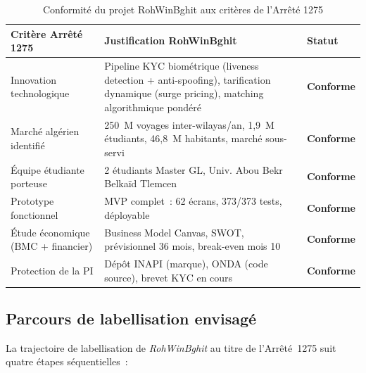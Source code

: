 \documentclass[12pt, a4paper, oneside]{report}
\begin{document}
\begin{table}[H]
\centering
\footnotesize
\renewcommand{\arraystretch}{1.3}
\begin{tabularx}{\textwidth}{|p{4cm}|X|p{2.5cm}|}
\hline
\rowcolor{rohlight}
\textbf{Critère Arrêté 1275} & \textbf{Justification RohWinBghit} & \textbf{Statut} \\
\hline
Innovation technologique & Pipeline KYC biométrique (liveness detection + anti-spoofing), tarification dynamique (surge pricing), matching algorithmique pondéré & \textcolor{green!60!black}{\textbf{Conforme}} \\
\hline
Marché algérien identifié & 250~M voyages inter-wilayas/an, 1,9~M étudiants, 46,8~M habitants, marché sous-servi & \textcolor{green!60!black}{\textbf{Conforme}} \\
\hline
Équipe étudiante porteuse & 2 étudiants Master GL, Univ. Abou Bekr Belkaïd Tlemcen & \textcolor{green!60!black}{\textbf{Conforme}} \\
\hline
Prototype fonctionnel & MVP complet~: 62 écrans, 373/373 tests, déployable & \textcolor{green!60!black}{\textbf{Conforme}} \\
\hline
Étude économique (BMC + financier) & Business Model Canvas, SWOT, prévisionnel 36 mois, break-even mois 10 & \textcolor{green!60!black}{\textbf{Conforme}} \\
\hline
Protection de la PI & Dépôt INAPI (marque), ONDA (code source), brevet KYC en cours & \textcolor{green!60!black}{\textbf{Conforme}} \\
\hline
\end{tabularx}
  \caption{Conformité du projet RohWinBghit aux critères de l'Arrêté 1275}
  \label{tab:arrete1275}
\end{table}

\subsection{Parcours de labellisation envisagé}

La trajectoire de labellisation de \textit{RohWinBghit} au titre de l'Arrêté~1275 suit quatre étapes séquentielles~:
\end{document}
